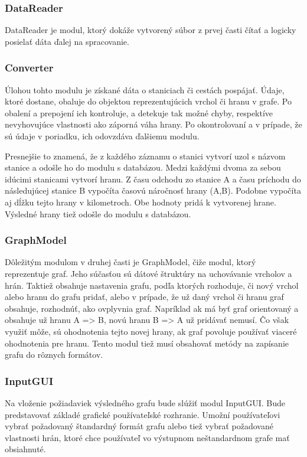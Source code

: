 \documentclass[12pt,twoside,slovak,a4paper]{article}
\begin{document}
		\subsubsection{DataReader}
		DataReader je modul, ktorý dokáže vytvorený súbor z prvej časti čítať a logicky posielať dáta ďalej na spracovanie.  
		\subsubsection{Converter}
		Úlohou tohto modulu je získané dáta o staniciach či cestách pospájať. Údaje, ktoré dostane, obaluje do objektou reprezentujúcich vrchol či hranu v grafe. Po obalení a prepojení ich kontroluje, a detekuje tak možné chyby, respektíve nevyhovujúce vlastnosti ako záporná váha hrany. Po okontrolovaní a v prípade, že sú údaje v poriadku, ich odovzdáva ďalšiemu modulu.
		
		Presnejšie to znamená, že z každého záznamu o stanici vytvorí uzol s názvom stanice a odošle ho do modulu s databázou. Medzi každými dvoma za sebou idúcimi stanicami vytvorí hranu. Z času odchodu zo stanice A a času príchodu do následujúcej stanice B vypočíta časovú náročnosť hrany (A,B). Podobne vypočíta aj dĺžku tejto hrany v kilometroch. Obe hodnoty pridá k vytvorenej hrane. Výsledné hrany tiež odošle do modulu s databázou.

	
		\subsubsection{GraphModel}
		Dôležitým modulom v druhej časti je GraphModel, čiže modul, ktorý reprezentuje graf. Jeho súčasťou sú dátové štruktúry na uchovávanie vrcholov a hrán. Taktiež obsahuje nastavenia grafu, podľa ktorých rozhoduje, či nový vrchol alebo hranu do grafu pridať, alebo v prípade, že už daný vrchol či hranu graf obsahuje, rozhodnúť, ako ovplyvnia graf. Napríklad ak má byť graf orientovaný a obsahuje už hranu A => B, novú hranu B => A už pridávať nemusí. Čo však využiť môže, sú ohodnotenia tejto novej hrany, ak graf povoluje používať viaceré ohodnotenia pre hranu. Tento modul tiež musí obsahovať metódy na zapísanie grafu do rôznych formátov. 
		\subsubsection{InputGUI}
		Na vloženie požiadaviek výsledného grafu bude slúžiť modul InputGUI. Bude predstavovať základé grafické používateľské rozhranie. Umožní používateľovi vybrať požadovaný štandardný formát grafu alebo tiež vybrať požadované vlastnosti hrán, ktoré chce používateľ vo výstupnom neštandardnom grafe mať obsiahnuté.
	
\end{document}
